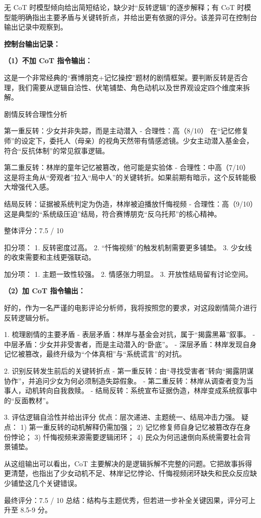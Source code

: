 \documentclass[UTF8, a4paper, 12pt]{ctexart}
\begin{document}
无 CoT 时模型倾向给出简短结论，缺少对“反转逻辑”的逐步解释；有 CoT 时模型能明确指出主要矛盾与关键转折点，并给出更有依据的评分。该差异可在控制台输出记录中观察到。

\textbf{控制台输出记录：}

\textbf{（1）不加 CoT 指令输出：}
\begin{OutputBlock}
这是一个非常经典的“赛博朋克+记忆操控”题材的剧情框架。要判断反转是否合理，我们需要从逻辑自洽性、伏笔铺垫、角色动机以及世界观设定四个维度来拆解。

剧情反转合理性分析

第一重反转：少女并非失踪，而是主动潜入
- 合理性：高（8/10）
在“记忆修复师”的设定下，委托人（母亲）的视角天然带有情感滤镜。少女主动潜入基金会，符合“反抗体制”的常见叙事逻辑。

第二重反转：林岸的童年记忆被篡改，他可能是实验体
- 合理性：中高（7/10）
这是将主角从“旁观者”拉入“局中人”的关键转折。如果前期有暗示，这个反转能极大增强代入感。

结局反转：证据被系统判定为伪造，林岸被迫播放忏悔视频
- 合理性：高（9/10）
这是典型的“系统级压迫”结局，符合赛博朋克“反乌托邦”的核心精神。

整体评分：7.5 / 10

扣分项：
1. 反转密度过高。
2. “忏悔视频”的触发机制需要更多铺垫。
3. 少女线的收束需要和主线更强联动。

加分项：
1. 主题一致性较强。
2. 情感张力明显。
3. 开放性结局留有讨论空间。
\end{OutputBlock}

\textbf{（2）加 CoT 指令输出：}
\begin{OutputBlock}
好的，作为一名严谨的电影评论分析师，我将按照您的要求，对这段剧情简介进行反转逻辑分析。

1. 梳理剧情的主要矛盾
- 表层矛盾：林岸与基金会对抗，属于“揭露黑幕”叙事。
- 中层矛盾：少女并非受害者，而是主动潜入的“卧底”。
- 深层矛盾：林岸发现自身记忆被篡改，最终升级为“个体真相”与“系统谎言”的对抗。

2. 识别反转发生前后的关键转折点
- 第一重反转：由“寻找受害者”转向“揭露阴谋协作”，并追问少女为何必须制造失踪假象。
- 第二重反转：林岸从调查者变为当事人，动机转向自我救赎。
- 结局反转：系统宣布证据伪造，林岸变成系统叙事中的“反面教材”。

3. 评估逻辑自洽性并给出评分
优点：层次递进、主题统一、结局冲击力强。
疑点：
1) 第一重反转的动机解释仍需加强；
2) 记忆修复师自身记忆被篡改存在身份悖论；
3) 忏悔视频来源需要逻辑闭环；
4) 民众为何迅速倒向系统需要社会背景铺垫。

从这组输出可以看出，CoT 主要解决的是逻辑拆解不完整的问题。它把故事拆得更清楚，也指出了少女动机不足、林岸记忆悖论、忏悔视频闭环缺失和民众反应缺少铺垫这几个关键错误。

最终评分：7.5 / 10
总结：结构与主题优秀，但若进一步补全关键因果，评分可上升至 8.5-9 分。
\end{OutputBlock}
\end{document}
